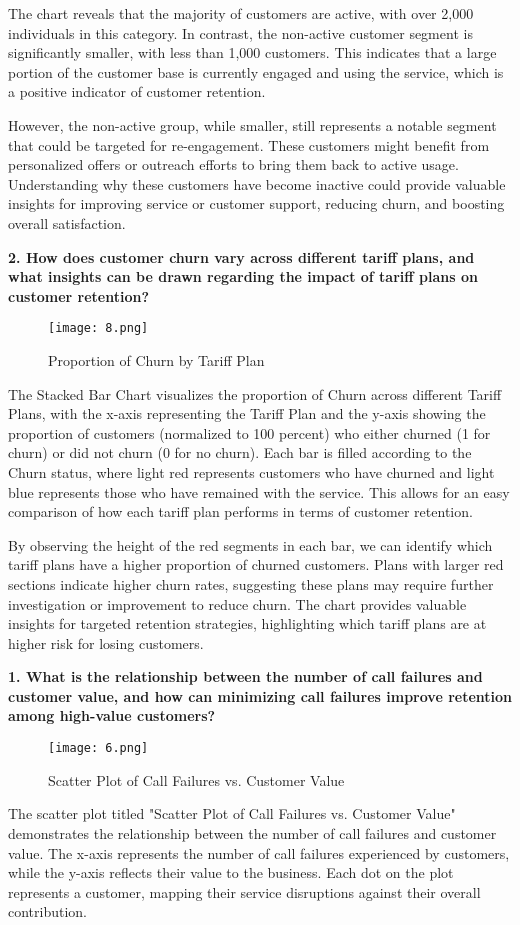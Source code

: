 \documentclass[12pt]{article}
\begin{document}
The chart reveals that the majority of customers are active, with over 2,000 individuals in this category. In contrast, the non-active customer segment is significantly smaller, with less than 1,000 customers. This indicates that a large portion of the customer base is currently engaged and using the service, which is a positive indicator of customer retention.

However, the non-active group, while smaller, still represents a notable segment that could be targeted for re-engagement. These customers might benefit from personalized offers or outreach efforts to bring them back to active usage. Understanding why these customers have become inactive could provide valuable insights for improving service or customer support, reducing churn, and boosting overall satisfaction.
\vspace{0.5cm}


\textbf{2. How does customer churn vary across different tariff plans, and what insights can be drawn regarding the impact of tariff plans on customer retention?}
\begin{figure}[h]
    \centering
    \texttt{[image: 8.png]}  
    \caption{Proportion of Churn by Tariff Plan}
\end{figure}
\FloatBarrier
The Stacked Bar Chart visualizes the proportion of Churn across different Tariff Plans, with the x-axis representing the Tariff Plan and the y-axis showing the proportion of customers (normalized to 100 percent) who either churned (1 for churn) or did not churn (0 for no churn). Each bar is filled according to the Churn status, where light red represents customers who have churned and light blue represents those who have remained with the service. This allows for an easy comparison of how each tariff plan performs in terms of customer retention.

By observing the height of the red segments in each bar, we can identify which tariff plans have a higher proportion of churned customers. Plans with larger red sections indicate higher churn rates, suggesting these plans may require further investigation or improvement to reduce churn. The chart provides valuable insights for targeted retention strategies, highlighting which tariff plans are at higher risk for losing customers.
\vspace{0.5cm}

\textbf{1. What is the relationship between the number of call failures and customer value, and how can minimizing call failures improve retention among high-value customers?}
\begin{figure}[h]
    \centering
    \texttt{[image: 6.png]}  
    \caption{Scatter Plot of Call Failures vs. Customer Value}
\end{figure}
\FloatBarrier
The scatter plot titled "Scatter Plot of Call Failures vs. Customer Value" demonstrates the relationship between the number of call failures and customer value. The x-axis represents the number of call failures experienced by customers, while the y-axis reflects their value to the business. Each dot on the plot represents a customer, mapping their service disruptions against their overall contribution.
\end{document}
